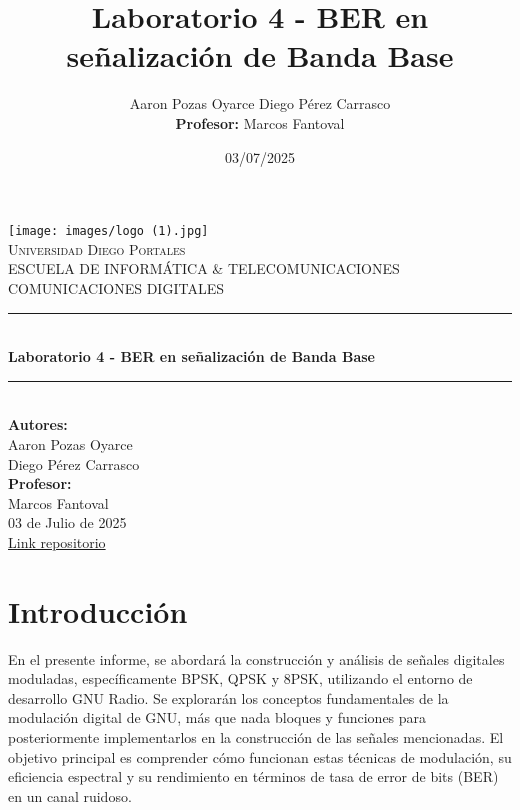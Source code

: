 \documentclass[12pt]{article}
\title{Laboratorio 4 - BER en señalización de Banda Base}
\author{Aaron Pozas Oyarce \linebreak
Diego Pérez Carrasco\\
\textbf{Profesor:} Marcos Fantoval}
\date{03/07/2025}
\begin{document}
\begin{titlepage}
    \centering
    \vspace*{0.0cm}
    \texttt{[image: images/logo (1).jpg]}\\
    \textsc{\LARGE Universidad Diego Portales}\\[0.2cm]
    \textsc{\large ESCUELA DE INFORMÁTICA \& TELECOMUNICACIONES}\\[2cm]
    \textsc{\LARGE COMUNICACIONES DIGITALES}\\[1cm]
    
    \rule{\linewidth}{0.2mm} \\[0.4cm]
    {\huge \bfseries Laboratorio 4 - BER en señalización de Banda Base}\\
    \rule{\linewidth}{0.2mm} \\[1.5cm]
    
    {\Large \textbf{Autores:}}\\
    Aaron Pozas Oyarce \\
    Diego Pérez Carrasco \\[1cm]
    
    {\Large \textbf{Profesor:}}\\
    Marcos Fantoval \\[1.5cm]
    
    {\large 03 de Julio de 2025}\\ [0.2cm]
    \href{https://github.com/Aropoint/Lab04-Comunicaciones_Digitales}{Link repositorio} \\[1cm]
\end{titlepage}

\newpage
\tableofcontents
\newpage

\section{Introducción}
\setlength{\parindent}{1cm}

En el presente informe, se abordará la construcción y análisis de señales digitales moduladas, específicamente BPSK, QPSK y 8PSK, utilizando el entorno de desarrollo GNU Radio. Se explorarán los conceptos fundamentales de la modulación digital de GNU, más que nada bloques y funciones para posteriormente implementarlos en la construcción de las señales mencionadas. El objetivo principal es comprender cómo funcionan estas técnicas de modulación, su eficiencia espectral y su rendimiento en términos de tasa de error de bits (BER) en un canal ruidoso.
\end{document}
